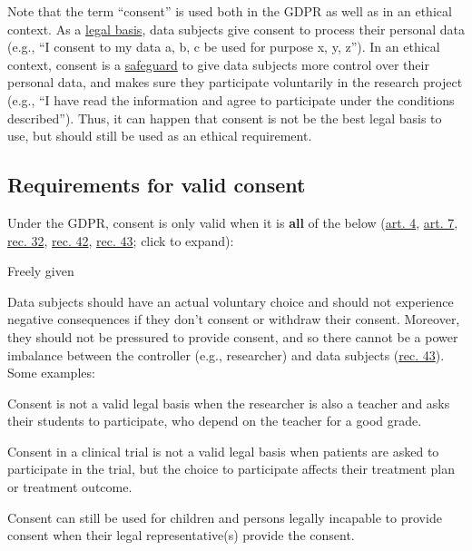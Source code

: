 \documentclass[
]{book}
\begin{document}
Note that the term ``consent'' is used both in the GDPR as well as in an ethical
context. As a \protect\hyperlink{legal-basis}{legal basis}, data subjects give consent
to process their personal data (e.g., ``I consent to my data a, b, c be used for
purpose x, y, z''). In an ethical context, consent is a
\href{https://edps.europa.eu/sites/default/files/publication/20-01-06_opinion_research_en.pdf\#page=20}{safeguard}
to give data subjects more control over their personal data, and makes sure they
participate voluntarily in the research project (e.g., ``I have read the
information and agree to participate under the conditions described''). Thus, it
can happen that consent is not be the best legal basis to use, but should still
be used as an ethical requirement.

\hypertarget{consent-requirements}{%
\subsection{Requirements for valid consent}\label{consent-requirements}}

Under the GDPR, consent is only valid when it is \textbf{all} of the below
(\href{https://gdpr-info.eu/art-4-gdpr/}{art. 4},
\href{https://gdpr-info.eu/art-7-gdpr/}{art. 7},
\href{https://gdpr-info.eu/recitals/no-32/}{rec. 32},
\href{https://gdpr-info.eu/recitals/no-42/}{rec. 42},
\href{https://gdpr-info.eu/recitals/no-43/}{rec. 43};
click to expand):

Freely given

Data subjects should have an actual voluntary choice and should not experience
negative consequences if they don't consent or withdraw their consent. Moreover,
they should not be pressured to provide consent, and so there cannot be a power
imbalance between the controller (e.g., researcher) and data subjects
(\href{https://gdpr-info.eu/recitals/no-43/}{rec. 43}).
Some examples:

Consent is not a valid legal basis when the researcher is also a
teacher and asks their students to participate, who depend on the teacher
for a good grade.

Consent in a clinical trial is not a valid legal basis when patients
are asked to participate in the trial, but the choice to participate
affects their treatment plan or treatment outcome.

Consent can still be used for children and persons legally incapable to
provide consent when their legal representative(s) provide the consent.
\end{document}
